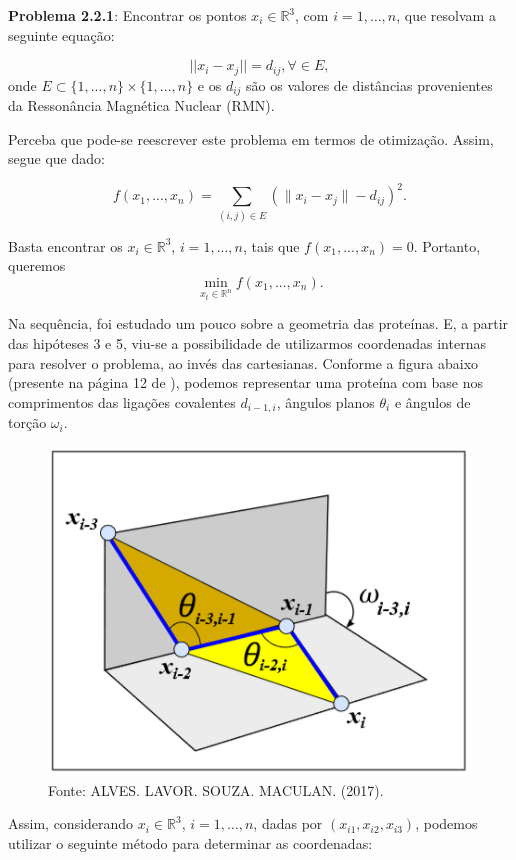 \documentclass[
	12pt,				%
	openright,			%
	twoside,			%
	a4paper,			%
	english,			%
	french,				%
	spanish,			%
	brazil				%
	]{abntex2}
\begin{document}
\noindent\textbf{Problema 2.2.1}: Encontrar os pontos $x_i\in\mathbb{R}^3$, com $i=1,\ldots,n$, que resolvam a seguinte equação:

$$||x_i -x_j||=d_{ij} , \forall\in E,
$$
onde $E \subset \{1, ...,n\} \times \{1, ...,n\}$ e os $d_{ij}$ são os valores de distâncias provenientes da Ressonância Magnética Nuclear (RMN).

Perceba que pode-se reescrever este problema em termos de otimização. Assim, segue que dado:

$$ f(x_1, ...,x_n) = \sum_{(i,j) \in E} (\|x_i - x_j\| - d_{ij})^2.
$$

Basta encontrar os $x_i \in \mathbb{R}^3$, $i = 1, ..., n$, tais que $f(x_1, ...,x_n)=0.$ Portanto, queremos
$$ \min_{x_t \in\mathbb{R}^n} f(x_1, ...,x_n).
$$

Na sequência, foi estudado um pouco sobre a geometria das proteínas. E, a partir das hipóteses 3 e 5, viu-se a possibilidade de utilizarmos coordenadas internas para resolver o problema, ao invés das cartesianas. Conforme a figura abaixo (presente na página 12 de \cite{1}), podemos representar uma proteína com base nos comprimentos das ligações covalentes $d_{i-1,i}$, ângulos planos $\theta_{i}$ e ângulos de torção $\omega_i$.

\begin{figure}[h]
    \centering
    \includegraphics[scale=0.50]{angulos.png}
    \caption*{Fonte: ALVES. LAVOR. SOUZA. MACULAN. (2017). }
  \end{figure} 

Assim, considerando $x_i\in\mathbb{R}^3$, $i=1,\ldots,n$, dadas por $(x_{i1},x_{i2},x_{i3})$, podemos utilizar o seguinte método para determinar as coordenadas:
\end{document}
